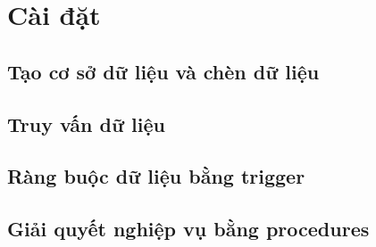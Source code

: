 \documentclass[a4paper, 12pt]{report}
\begin{document}
\chapter{Cài đặt}

\section{Tạo cơ sở dữ liệu và chèn dữ liệu}



\section{Truy vấn dữ liệu}



\section{Ràng buộc dữ liệu bằng trigger}



\section{Giải quyết nghiệp vụ bằng procedures}


\end{document}
